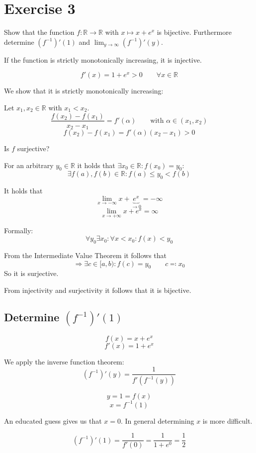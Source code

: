\documentclass[a4paper]{article}
\theoremstyle{definition}
\begin{document}
\section{Exercise 3}
%
\begin{ex}
  Show that the function $f: \mathbb R \to \mathbb R$ with $x \mapsto x + e^x$
  is bijective. Furthermore determine $(f^{-1})'(1)$ and $\lim_{y\to\infty}(f^{-1})'(y)$.
\end{ex}

If the function is strictly monotonically increasing,
it is injective.

\[ f'(x) = 1 + e^x > 0 \qquad \forall x \in \mathbb R \]

We show that it is strictly monotonically increasing:

Let $x_1, x_2 \in \mathbb R$ with $x_1 < x_2$.
\[ \frac{f(x_2) - f(x_1)}{x_2 - x_1} = f'(\alpha) \qquad \text{with } \alpha \in (x_1, x_2) \]
\[ f(x_2) - f(x_1) = f'(\alpha)(x_2 - x_1) > 0  \]

Is $f$ surjective?

For an arbitrary $y_0 \in \mathbb R$ it holds that $\exists x_0 \in \mathbb R: f(x_0) = y_0$:
\[ \exists f(a), f(b) \in \mathbb R: f(a) \leq y_0 < f(b) \]

It holds that
\[ \lim_{x\to-\infty} x + \underbrace{e^x}_{\to 0} = -\infty \]
\[ \lim_{x\to+\infty} x + e^x = \infty \]

Formally:
\[ \forall y_0 \exists x_0: \forall x < x_0: f(x) < y_0 \]

From the Intermediate Value Theorem it follows that
\[ \Rightarrow \exists c \in [a,b): f(c) = y_0 \qquad c \eqqcolon x_0 \]
So it is surjective.

From injectivity and surjectivity it follows that it is bijective.

\subsection{Determine $(f^{-1})'(1)$}
%
\[ f(x) = x + e^x \]
\[ f'(x) = 1 + e^x \]

We apply the inverse function theorem:
\[ \left(f^{-1}\right)'(y) = \frac{1}{f'(f^{-1}(y))} \]

\[ y = 1 = f(x) \]
\[ x = f^{-1}(1) \]

An educated guess gives us that $x = 0$. In general determining $x$ is more difficult.

\[ \left(f^{-1}\right)'(1) = \frac{1}{f'(0)} = \frac{1}{1 + e^0} = \frac12 \]
\end{document}
